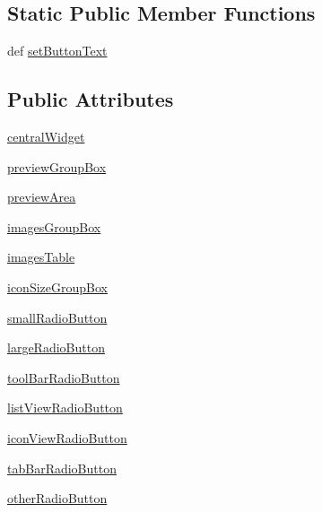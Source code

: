 \subsection*{Static Public Member Functions}
\begin{DoxyCompactItemize}
\item 
def \hyperlink{classicons_1_1MainWindow_ada4e05f5f34d7a0462240b57a90ba4bf}{set\+Button\+Text}
\end{DoxyCompactItemize}
\subsection*{Public Attributes}
\begin{DoxyCompactItemize}
\item 
\hyperlink{classicons_1_1MainWindow_a1150d46b6ab9f737c7058525f24791fc}{central\+Widget}
\item 
\hyperlink{classicons_1_1MainWindow_a72937c478c4a3fb75774680f148fac25}{preview\+Group\+Box}
\item 
\hyperlink{classicons_1_1MainWindow_a32e9f2fde185d3cbcf8784fa463abc1f}{preview\+Area}
\item 
\hyperlink{classicons_1_1MainWindow_ab6c078ffe6a655f57430dae74c4c5a04}{images\+Group\+Box}
\item 
\hyperlink{classicons_1_1MainWindow_afd9f4b250d27ad68231ac372ac3ec46b}{images\+Table}
\item 
\hyperlink{classicons_1_1MainWindow_a042b60cff66cb8b219689b8eb7134f2d}{icon\+Size\+Group\+Box}
\item 
\hyperlink{classicons_1_1MainWindow_a30fa73afab7ff87e8a0d75795c6a3a20}{small\+Radio\+Button}
\item 
\hyperlink{classicons_1_1MainWindow_afafe8589e87c37c9bae5ca259a0898c9}{large\+Radio\+Button}
\item 
\hyperlink{classicons_1_1MainWindow_a25da9e2984e5a668bfa84e0f920ec417}{tool\+Bar\+Radio\+Button}
\item 
\hyperlink{classicons_1_1MainWindow_a7b2c82aebd08b275568fcaa027288d16}{list\+View\+Radio\+Button}
\item 
\hyperlink{classicons_1_1MainWindow_aa60916fd5f32c54189772a0955678e92}{icon\+View\+Radio\+Button}
\item 
\hyperlink{classicons_1_1MainWindow_afc8cc90979c02dc8412e60dc289084f9}{tab\+Bar\+Radio\+Button}
\item 
\hyperlink{classicons_1_1MainWindow_af6936687d9a7d49cf147c9309b4ee40d}{other\+Radio\+Button}
\item 

\end{DoxyCompactItemize}
